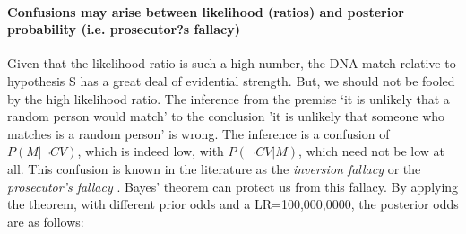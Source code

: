 \documentclass[10pt]{article}
\begin{document}
\begin{comment}
It is instructive too compare it with Adam's alibi. 
The problem is that with Adam's alibi, the numbers can only be educated 
guesses. Suppose, for the sake of argument, that Adam's girlfriend is trustworthy.
This means it is unlikely that she would provide an alibi for 
Adam if he had not been with her, say $P(A| \neg CS)=1/100$.
At the same time, it is very likely she would provide an alibi if Adam had been with her, say
$P(A| \neg CS)=99/100$. So, the assignment of the 
likelihood ratio could be
as follows:
%
\[LR_A=\frac{P(A| CV)}{P(A| \neg CV)}=\frac{\frac{1}{100}}{\frac{99}{100}} \approx \frac{1}{100}.\]
%
A likelihood ratio of $\frac{1}{100}$ gives a lot of credit to Adam's girlfriend. If, however, it turned out 
that Adam's girlfriend was not trustworthy, the likelihood ratio should be revised upwards. 
As the reader can see, this is an example of a conflict between two pieces of evidence. 
The DNA match and Adam's are assigned, respectively, likelihood ratios greater 
than one smaller than one. What is more interesting at this point is that the extent 
of this conflict can be---at least in theory---quantified. Which one of the two 
pieces of evidence is stronger? Given the numbers we have, the DNA evidence is 
significantly stronger than Adam's alibi. This 
\end{comment}








\paragraph{Confusions may arise between likelihood (ratios) and posterior probability (i.e. prosecutor?s fallacy)}
Given that the likelihood ratio is such a high number, the DNA match relative to 
hypothesis S has a great deal of evidential strength. 
But, we should not be fooled by the high likelihood ratio.  
The inference from the premise `it is unlikely that a random person would match' to 
the conclusion 'it is unlikely that someone who matches is a random person' is wrong. 
The inference is a confusion of $P(M |\neg CV)$, which is indeed low, with $P(\neg CV | M)$, 
which need not be low at all. This confusion is known in the literature 
as the \textit{inversion fallacy} or the \textit{prosecutor's fallacy} \citep{Thompson1987Interpretation}. 
Bayes' theorem can protect us from this fallacy. By applying the theorem, 
with different prior odds and a LR=100,000,0000,  
the posterior odds are as follows:
\end{document}
